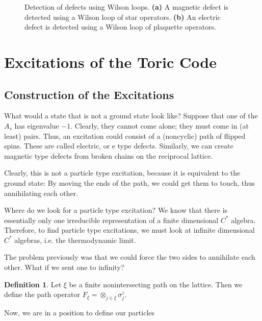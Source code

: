 \documentclass[prb,11pt, nofootinbib]{revtex4-2}
\theoremstyle{definition}
\theoremstyle{definition}
\theoremstyle{definition}
\theoremstyle{definition}
\newtheorem{Definition}[Theorem]{Definition}
\begin{document}
\begin{figure}
{
}
	\caption{Detection of defects using Wilson loops. \textbf{(a)} A magnetic defect is detected using a Wilson loop of star operators. \textbf{(b)} An electric defect is detected using a Wilson loop of plaquette operators.}
	\label{fig:wilsonloop}
\end{figure}

\section{Excitations of the Toric Code}
\subsection{Construction of the Excitations}
What would a state that is not a ground state look like? Suppose that one of the $A_s$ has eigenvalue $-1$. Clearly, they cannot come alone; they must come in (at least) pairs. Thus, an excitation could consist of a (noncyclic) path of flipped spins. These are called electric, or e type defects. Similarly, we can create magnetic type defects from broken chains on the reciprocal lattice.

Clearly, this is not a particle type excitation, because it is equivalent to the ground state: By moving the ends of the path, we could get them to touch, thus annihilating each other. 

Where do we look for a particle type excitation? We know that there is essentially only one irreducible representation of a finite dimensional $C^*$ algebra. Therefore, to find particle type excitations, we must look at infinite dimensional $C^*$ algebras, i.e. the thermodynamic limit.

The problem previously was that we could force the two sides to annihilate each other. What if we sent one to infinity?

\begin{Definition}
	Let $\xi$ be a finite nonintersecting path on the lattice. Then we define the path operator $F_\xi = \otimes_{j\in \xi}\sigma_j^z$. 
\end{Definition}

Now, we are in a position to define our particles
\end{document}
